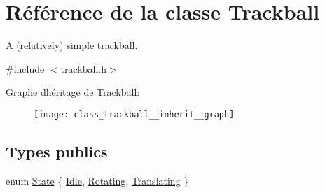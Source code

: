 \hypertarget{class_trackball}{}\section{Référence de la classe Trackball}
\label{class_trackball}


A (relatively) simple trackball.  




{\ttfamily \#include $<$trackball.\+h$>$}



Graphe d\textquotesingle{}héritage de Trackball\+:\nopagebreak
\begin{figure}[H]
\begin{center}
\leavevmode
\texttt{[image: class\_trackball\_\_inherit\_\_graph]}
\end{center}
\end{figure}
\subsection*{Types publics}
\begin{DoxyCompactItemize}
\item 
enum \hyperlink{class_trackball_a102216413a87cb37801044063a1b05be}{State} \{ \hyperlink{class_trackball_a102216413a87cb37801044063a1b05bea88bef1e83c8258b076d64eff20ca5e5e}{Idle}, 
\hyperlink{class_trackball_a102216413a87cb37801044063a1b05bea50dbabb8cff2af19785a0d60f981a350}{Rotating}, 
\hyperlink{class_trackball_a102216413a87cb37801044063a1b05bea8a733b5b2990e439a541b6615351d382}{Translating}
 \}
\end{DoxyCompactItemize}
